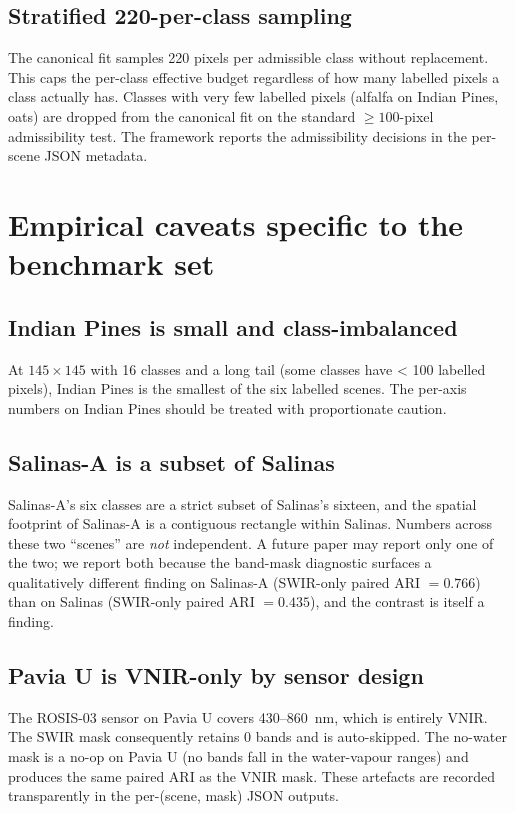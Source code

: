 \documentclass[11pt,a4paper]{article}
\begin{document}
\subsection{Stratified 220-per-class sampling}
The canonical fit samples 220 pixels per admissible class without
replacement. This caps the per-class effective budget regardless of
how many labelled pixels a class actually has. Classes with very few
labelled pixels (alfalfa on Indian Pines, oats) are dropped from the
canonical fit on the standard $\ge 100$-pixel admissibility test.
The framework reports the admissibility decisions in the per-scene
JSON metadata.

\section{Empirical caveats specific to the benchmark set}

\subsection{Indian Pines is small and class-imbalanced}
At $145 \times 145$ with 16 classes and a long tail (some classes have
< 100 labelled pixels), Indian Pines is the smallest of the six
labelled scenes. The per-axis numbers on Indian Pines should be
treated with proportionate caution.

\subsection{Salinas-A is a subset of Salinas}
Salinas-A's six classes are a strict subset of Salinas's sixteen,
and the spatial footprint of Salinas-A is a contiguous rectangle
within Salinas. Numbers across these two ``scenes'' are
\emph{not} independent. A future paper may report only one of the
two; we report both because the band-mask diagnostic surfaces a
qualitatively different finding on Salinas-A (SWIR-only paired ARI
$= 0.766$) than on Salinas (SWIR-only paired ARI $= 0.435$), and
the contrast is itself a finding.

\subsection{Pavia U is VNIR-only by sensor design}
The ROSIS-03 sensor on Pavia U covers 430--860~nm, which is entirely
VNIR. The SWIR mask consequently retains 0 bands and is
auto-skipped. The no-water mask is a no-op on Pavia U (no bands
fall in the water-vapour ranges) and produces the same paired ARI as
the VNIR mask. These artefacts are recorded transparently in the
per-(scene, mask) JSON outputs.
\end{document}
